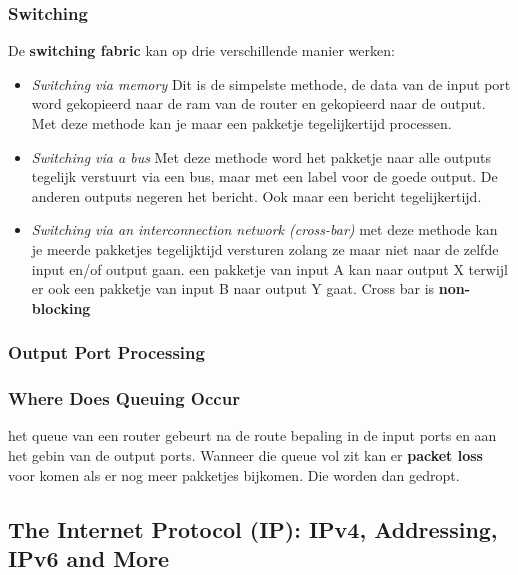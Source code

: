 \subsubsection{Switching}
De \textbf{switching fabric} kan op drie verschillende manier werken:
\begin{itemize}
    \item \textit{Switching via memory} Dit is de simpelste methode, de data van de input port word gekopieerd naar de ram van de router en gekopieerd naar de output. Met deze methode kan je maar een pakketje tegelijkertijd processen.
    \item \textit{Switching via a bus} Met deze methode word het pakketje naar alle outputs tegelijk verstuurt via een bus, maar met een label voor de goede output. De anderen outputs negeren het bericht. Ook maar een bericht tegelijkertijd.
    \item \textit{Switching via an interconnection network (cross-bar)} met deze methode kan je meerde pakketjes tegelijktijd versturen zolang ze maar niet naar de zelfde input en/of output gaan. een pakketje van input A kan naar output X terwijl er ook een pakketje van input B naar output Y gaat. Cross bar is \textbf{non-blocking}
\end{itemize}
\subsubsection{Output Port Processing}

\subsubsection{Where Does Queuing Occur}
het queue van een router gebeurt na de route bepaling in de input ports en aan het gebin van de output ports. Wanneer die queue vol zit kan er \textbf{packet loss} voor komen als er nog meer pakketjes bijkomen. Die worden dan gedropt.


\subsection{The Internet Protocol (IP): IPv4, Addressing, IPv6 and More}
